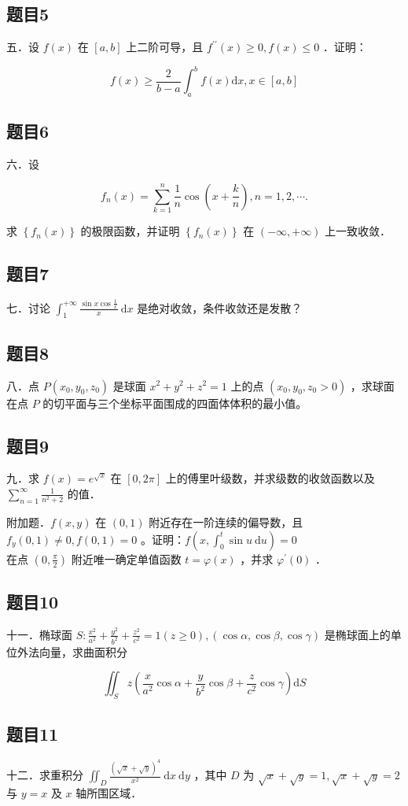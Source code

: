 \documentclass{article}
\begin{document}
\subsection{题目5}
五．设 \(f(x)\) 在 \([a, b]\) 上二阶可导，且 \(f^{\prime \prime}(x) \geq 0, f(x) \leq 0\) ．证明：

\[
f(x) \geq \frac{2}{b-a} \int_{a}^{b} f(x) \mathrm{d} x, x \in[a, b]
\]

\subsection{题目6}
六．设

\[
f_{n}(x)=\sum_{k=1}^{n} \frac{1}{n} \cos \left(x+\frac{k}{n}\right), n=1,2, \cdots .
\]

求 \(\left\{f_{n}(x)\right\}\) 的极限函数，并证明 \(\left\{f_{n}(x)\right\}\) 在 \((-\infty,+\infty)\) 上一致收敛．

\subsection{题目7}
七．讨论 \(\int_{1}^{+\infty} \frac{\sin x \cos \frac{1}{x}}{x} \mathrm{~d} x\) 是绝对收敛，条件收敛还是发散？

\subsection{题目8}
八．点 \(P\left(x_{0}, y_{0}, z_{0}\right)\) 是球面 \(x^{2}+y^{2}+z^{2}=1\) 上的点 \(\left(x_{0}, y_{0}, z_{0}>0\right)\) ，求球面在点 \(P\) 的切平面与三个坐标平面围成的四面体体积的最小值。

\subsection{题目9}
九．求 \(f(x)=e^{\sqrt{x}}\) 在 \([0,2 \pi]\) 上的傅里叶级数，并求级数的收敛函数以及 \(\sum_{n=1}^{\infty} \frac{1}{n^{2}+2}\) 的值．

附加题．\(f(x, y)\) 在 \((0,1)\) 附近存在一阶连续的偏导数，且 \(f_{y}(0,1) \neq 0, f(0,1)=0\) 。证明：\(f\left(x, \int_{0}^{t} \sin u \mathrm{~d} u\right)=0\)\\
在点 \(\left(0, \frac{\pi}{2}\right)\) 附近唯一确定单值函数 \(t=\varphi(x)\) ，并求 \(\varphi^{\prime}(0)\) ．

\subsection{题目10}
十一．椭球面 \(S: \frac{x^{2}}{a^{2}}+\frac{y^{2}}{b^{2}}+\frac{z^{2}}{c^{2}}=1(z \geq 0),(\cos \alpha, \cos \beta, \cos \gamma)\) 是椭球面上的单位外法向量，求曲面积分

\[
\iint_{S} z\left(\frac{x}{a^{2}} \cos \alpha+\frac{y}{b^{2}} \cos \beta+\frac{z}{c^{2}} \cos \gamma\right) \mathrm{d} S
\]

\subsection{题目11}
十二．求重积分 \(\iint_{D} \frac{(\sqrt{x}+\sqrt{y})^{4}}{x^{2}} \mathrm{~d} x \mathrm{~d} y\) ，其中 \(D\) 为 \(\sqrt{x}+\sqrt{y}=1, \sqrt{x}+\sqrt{y}=2\) 与 \(y=x\) 及 \(x\) 轴所围区域．
\end{document}
